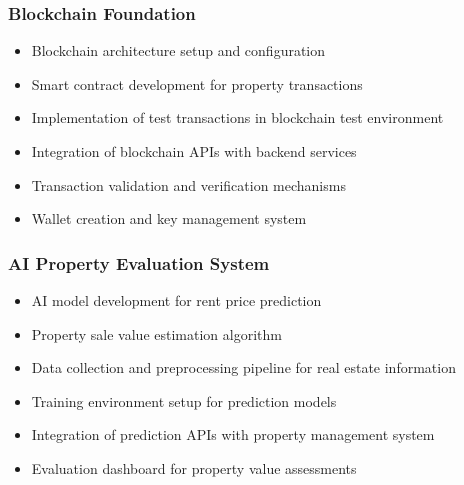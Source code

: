 \subsubsection{Blockchain Foundation}
\begin{itemize}
    \item Blockchain architecture setup and configuration
    \item Smart contract development for property transactions
    \item Implementation of test transactions in blockchain test environment
    \item Integration of blockchain APIs with backend services
    \item Transaction validation and verification mechanisms
    \item Wallet creation and key management system
\end{itemize}

\subsubsection{AI Property Evaluation System}
\begin{itemize}
    \item AI model development for rent price prediction
    \item Property sale value estimation algorithm
    \item Data collection and preprocessing pipeline for real estate information
    \item Training environment setup for prediction models
    \item Integration of prediction APIs with property management system
    \item Evaluation dashboard for property value assessments
\end{itemize}

